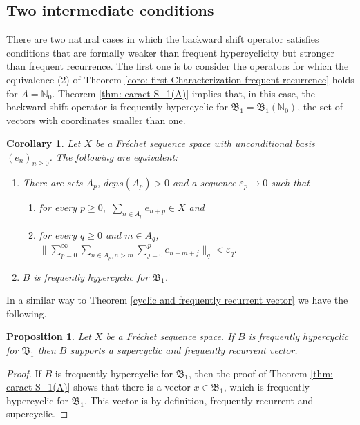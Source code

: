 \documentclass[11pt]{amsart}
\newtheorem{proposition}[theorem]{Proposition}
\newtheorem{corollary}[theorem]{Corollary}
\begin{document}
\subsection{Two intermediate conditions\label{intermediate}}
There are two natural cases in which the backward shift operator satisfies conditions  that are formally weaker than frequent hypercyclicity but stronger than frequent recurrence. The first  one is to consider the operators for which the equivalence (2) of Theorem \ref{coro: first Characterization frequent recurrence} holds for $A=\mathbb N_0$.
 Theorem \ref{thm: caract S_1(A)} implies that, in this case, the backward shift operator is frequently hypercyclic for $\mathfrak B_1=\mathfrak B_1(\mathbb N_0)$, the set of vectors with coordinates smaller than one.
\begin{corollary}\label{Teo: caract freq hyp on S1}
    Let $X$ be a Fr\'echet sequence space with  unconditional basis $(e_n)_{n\ge 0}$. The following are equivalent:
\begin{enumerate}
    \item There are sets $A_p$, $\underline {dens}(A_p)>0$ and a sequence $\varepsilon_p\to 0$ such that
    \begin{enumerate}
        \item [i)] for every $p\ge 0,$ $\sum_{n\in A_p} e_{n+p}\in X$ and
        \item [ii)] for every $q\ge 0$ and $m\in A_q$, $\|\sum_{p=0}^\infty \sum_{n\in A_p,n>m}\sum_{j=0}^p e_{n-m+j}\|_q<\varepsilon_q.
    $    
        \end{enumerate}
\item $B$ is frequently hypercyclic for $\mathfrak B_1$.


\end{enumerate}
\end{corollary}

In a similar way to Theorem \ref{cyclic and frequently recurrent vector} we have the following. 
\begin{proposition}
     Let $X$ be a Fr\'echet sequence space. If  $B$ is frequently hypercyclic for $\mathfrak B_1$ then $B$ supports a supercyclic and frequently recurrent vector.
 \end{proposition}
\begin{proof}
If $B$ is frequently hypercyclic for $\mathfrak B_1$, then the proof of Theorem \ref{thm: caract S_1(A)} shows that there is a vector $x\in \mathfrak B_1$, which is frequently hypercyclic for $\mathfrak B_1$. This vector is by definition, frequently recurrent and supercyclic.
\end{proof}
\end{document}
